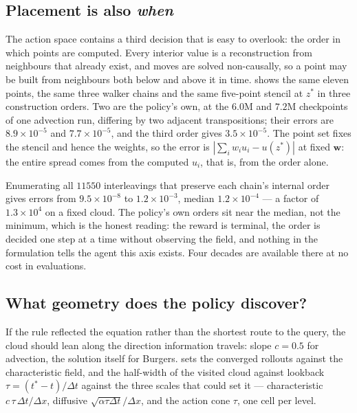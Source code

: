 \subsection{Placement is also \emph{when}}
\label{sec:results_when}

The action space contains a third decision that is easy to overlook: the order in
which points are computed. Every interior value is a reconstruction from
neighbours that already exist, and moves are solved non-causally, so a point may
be built from neighbours both below and above it in time.  shows
the same eleven points, the same three walker chains and the same five-point
stencil at $z^{*}$ in three construction orders. Two are the policy's own, at the
$6.0$M and $7.2$M checkpoints of one advection run, differing by two adjacent
transpositions; their errors are $8.9\times10^{-5}$ and $7.7\times10^{-5}$, and
the third order gives $3.5\times10^{-5}$. The point set fixes the stencil and
hence the weights, so the error is $|\sum_i w_i u_i - u(z^{*})|$ at fixed
$\mathbf{w}$: the entire spread comes from the computed $u_i$, that is, from the
order alone.

Enumerating all $11550$ interleavings that preserve each chain's internal order
gives errors from $9.5\times10^{-8}$ to $1.2\times10^{-3}$, median
$1.2\times10^{-4}$ --- a factor of $1.3\times10^{4}$ on a fixed cloud. The
policy's own orders sit near the median, not the minimum, which is the honest
reading: the reward is terminal, the order is decided one step at a time without
observing the field, and nothing in the formulation tells the agent this axis
exists. Four decades are available there at no cost in evaluations.


\subsection{What geometry does the policy discover?}
\label{sec:results_geometry}

If the rule reflected the equation rather than the shortest route to the query,
the cloud should lean along the direction information travels: slope $c=0.5$ for
advection, the solution itself for Burgers.  sets the
converged rollouts against the characteristic field, and the half-width of the
visited cloud against lookback $\tau=(t^{*}-t)/\Delta t$ against the three scales
that could set it --- characteristic $c\,\tau\,\Delta t/\Delta x$, diffusive
$\sqrt{\alpha\tau\Delta t}/\Delta x$, and the action cone $\tau$, one cell per
level.

